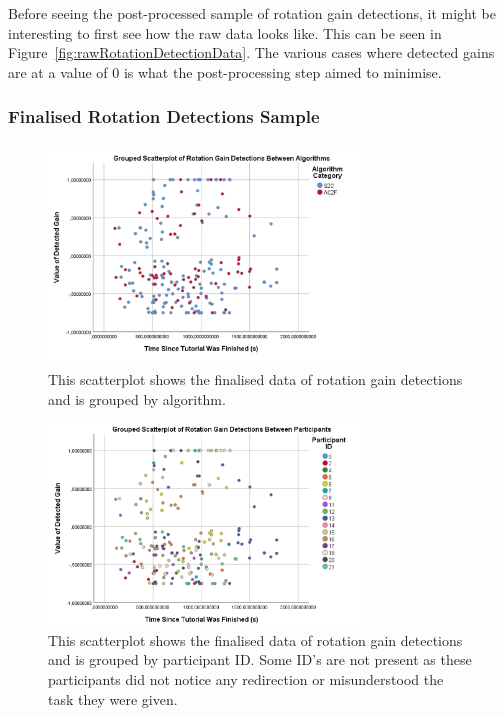 Before seeing the post-processed sample of rotation gain detections, it might be interesting to first see how the raw data looks like. This can be seen in Figure~\ref{fig:rawRotationDetectionData}. The various cases where detected gains are at a value of 0 is what the post-processing step aimed to minimise. 

\subsubsection{Finalised Rotation Detections Sample}
\begin{figure}[tbph]
    \centering
    \includegraphics[width=0.75\textwidth]{figures/graphs/ProcessedRotationDetections.png}
    \caption[Finalised Detection Scatterplot For Rotation Gains, Grouped by Algorithm]{This scatterplot shows the finalised data of rotation gain detections and is grouped by algorithm.}
    \label{fig:rotationDetectionDataByAlgorithm}
\end{figure}

\begin{figure}[tbph]
    \centering
    \includegraphics[width=0.75\textwidth]{figures/graphs/ProcessedRotationDetectionsByParticipant.png}
    \caption[Finalised Detection Scatterplot For Rotation Gains, Grouped by Participant ID]{This scatterplot shows the finalised data of rotation gain detections and is grouped by participant ID. Some ID's are not present as these participants did not notice any redirection or misunderstood the task they were given.}
    \label{fig:rotationDetectionDataByParticipant}
\end{figure}


